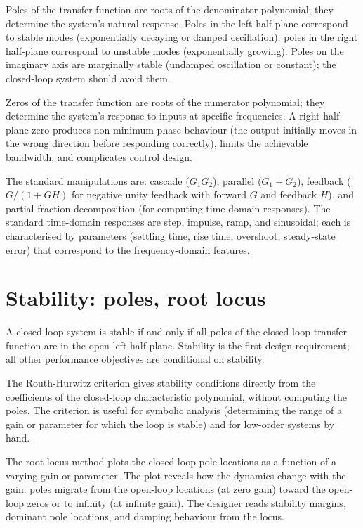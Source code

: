 Poles of the transfer function are roots of the denominator polynomial; they determine the system's natural response. Poles in the left half-plane correspond to stable modes (exponentially decaying or damped oscillation); poles in the right half-plane correspond to unstable modes (exponentially growing). Poles on the imaginary axis are marginally stable (undamped oscillation or constant); the closed-loop system should avoid them.

Zeros of the transfer function are roots of the numerator polynomial; they determine the system's response to inputs at specific frequencies. A right-half-plane zero produces non-minimum-phase behaviour (the output initially moves in the wrong direction before responding correctly), limits the achievable bandwidth, and complicates control design.

The standard manipulations are: cascade ($G_1 G_2$), parallel ($G_1 + G_2$), feedback ($G/(1 + GH)$ for negative unity feedback with forward $G$ and feedback $H$), and partial-fraction decomposition (for computing time-domain responses). The standard time-domain responses are step, impulse, ramp, and sinusoidal; each is characterised by parameters (settling time, rise time, overshoot, steady-state error) that correspond to the frequency-domain features.

\section{Stability: poles, root locus}

A closed-loop system is stable if and only if all poles of the closed-loop transfer function are in the open left half-plane. Stability is the first design requirement; all other performance objectives are conditional on stability.

The Routh-Hurwitz criterion gives stability conditions directly from the coefficients of the closed-loop characteristic polynomial, without computing the poles. The criterion is useful for symbolic analysis (determining the range of a gain or parameter for which the loop is stable) and for low-order systems by hand.

The root-locus method plots the closed-loop pole locations as a function of a varying gain or parameter. The plot reveals how the dynamics change with the gain: poles migrate from the open-loop locations (at zero gain) toward the open-loop zeros or to infinity (at infinite gain). The designer reads stability margins, dominant pole locations, and damping behaviour from the locus.

